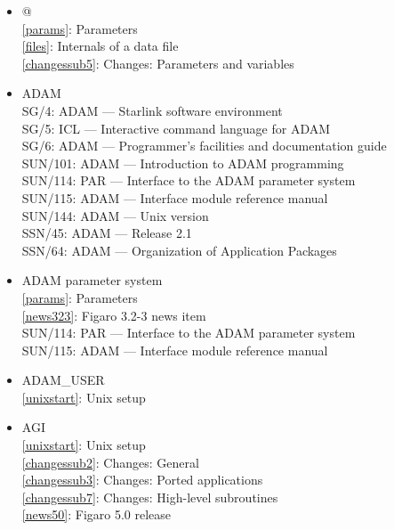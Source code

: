 \documentclass[11pt,twoside]{article}
\newcommand{\htmlref}[2]{#1}
\newcommand{\xref}[3]{#1}
\newcommand{\idxint}[2]{\ref{#1}: \htmlref{#2}{#1}}
\newcommand{\idxint}[2]{\htmlref{#2}{#1}}
\newcommand{\latorhtm}[2]{#1}
\newcommand{\latorhtm}[2]{#2}
\begin{document}
\begin{itemize}
\item @\\
   \idxint{params}{Parameters}\\
   \idxint{files}{Internals of a data file}\\
   \idxint{changessub5}{Changes: Parameters and variables}
\item ADAM\\
   \xref{SG/4: ADAM \latorhtm{---}{-} Starlink software environment}{sg4}{}\\
   \xref{SG/5: ICL \latorhtm{---}{-} Interactive command language for ADAM}{sg5}{}\\
   \xref{SG/6: ADAM \latorhtm{---}{-} Programmer's facilities and documentation guide}{sg6}{}\\
   \xref{SUN/101: ADAM \latorhtm{---}{-} Introduction to ADAM programming}{sun101}{}\\
   \xref{SUN/114: PAR \latorhtm{---}{-} Interface to the ADAM parameter system}{sun114}{}\\
   \xref{SUN/115: ADAM \latorhtm{---}{-} Interface module reference manual}{sun115}{}\\
   \xref{SUN/144: ADAM \latorhtm{---}{-} Unix version}{sun144}{}\\
   \xref{SSN/45: ADAM \latorhtm{---}{-} Release 2.1}{ssn45}{}\\
   \xref{SSN/64: ADAM \latorhtm{---}{-} Organization of Application Packages}{ssn64}{}
\item ADAM parameter system\\
   \idxint{params}{Parameters}\\
   \idxint{news323}{Figaro 3.2-3 news item}\\
   \xref{SUN/114: PAR \latorhtm{---}{-} Interface to the ADAM parameter system}{sun114}{}\\
   \xref{SUN/115: ADAM \latorhtm{---}{-} Interface module reference manual}{sun115}{}
\item ADAM\_USER\\
   \idxint{unixstart}{Unix setup}
\item AGI\\
   \idxint{unixstart}{Unix setup}\\
   \idxint{changessub2}{Changes: General}\\
   \idxint{changessub3}{Changes: Ported applications}\\
   \idxint{changessub7}{Changes: High-level subroutines}\\
   \idxint{news50}{Figaro 5.0 release}\\

\end{itemize}
\end{document}
